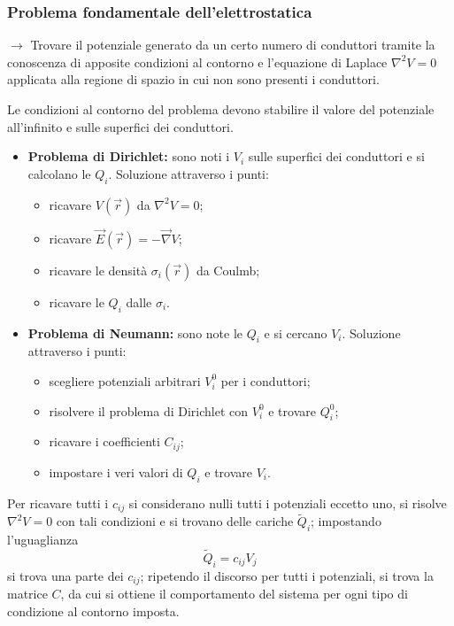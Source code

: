 \documentclass[10pt, a4paper]{scrartcl}
\numberwithin{equation}{subsection}
\theoremstyle{style1}
\begin{document}
\subsubsection{Problema fondamentale dell'elettrostatica}

$\to$ Trovare il potenziale generato da un certo numero di conduttori tramite la conoscenza di apposite condizioni al contorno e l'equazione di Laplace $\nabla ^2 V = 0$ applicata alla regione di spazio in cui non sono presenti i conduttori.

Le condizioni al contorno del problema devono stabilire il valore del potenziale all'infinito e sulle superfici dei conduttori.

\begin{itemize}
	\item \textbf{Problema di Dirichlet:} sono noti i $V_i$ sulle superfici dei conduttori e si calcolano le $Q_i$. Soluzione attraverso i punti:
		\begin{itemize}
			\item ricavare $V(\vec{r})$ da $\nabla ^2V = 0$;
			\item ricavare $\vec{E}(\vec{r}) = - \vec{\nabla }V$;
			\item ricavare le densit\`a $\sigma _i(\vec{r})$ da Coulmb;
			\item ricavare le $Q_i$ dalle $\sigma _i$.
		\end{itemize}
	\item \textbf{Problema di Neumann:} sono note le $Q_i$ e si cercano $V_i$. Soluzione attraverso i punti:
		\begin{itemize}
			\item scegliere potenziali arbitrari $V_i^0$ per i conduttori;
			\item risolvere il problema di Dirichlet con $V^0_i$ e trovare $Q_i^0$;
			\item ricavare i coefficienti $C_{ij} $;
			\item impostare i veri valori di $Q_i$ e trovare $V_i$.
		\end{itemize}
\end{itemize}
Per ricavare tutti i $c_{ij} $ si considerano nulli tutti i potenziali eccetto uno, si risolve $\nabla ^2 V=0$ con tali condizioni e si trovano delle cariche $\widetilde{Q}_i$; impostando l'uguaglianza
\[
\widetilde{Q}_i = c_{ij}  V_j 
\] 
si trova una parte dei $c_{ij} $; ripetendo il discorso per tutti i potenziali, si trova la matrice $C$, da cui si ottiene il comportamento del sistema per ogni tipo di condizione al contorno imposta.
\end{document}
